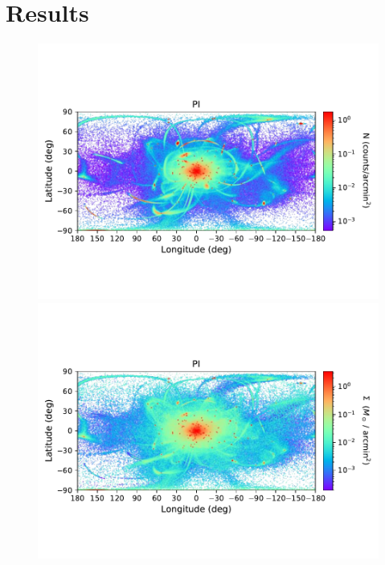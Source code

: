 \section{Results}\label{results}
    \twocolumn
    \begin{figure}[h!]
        \begin{center}
            \includegraphics[clip=true, trim = 0mm 20mm 0mm 20mm, width=\columnwidth]{images/PI_ensemble_LB_count_density.pdf}
            \includegraphics[clip=true, trim = 0mm 20mm 0mm 20mm, width=\columnwidth]{images/PI_ensemble_LB_density_mass.pdf}
            

\end{center}
\end{figure}
